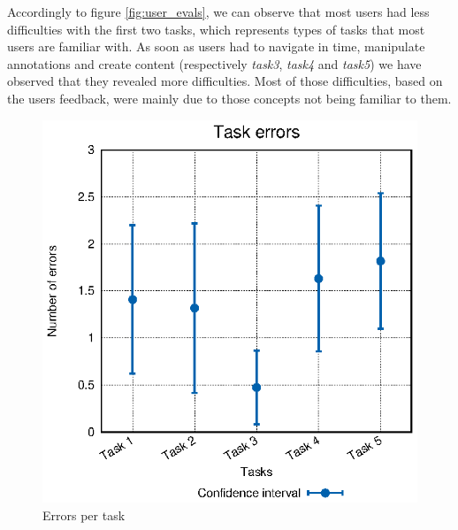 Accordingly to figure \ref{fig:user_evals}, we can observe that most users had less difficulties with the first two tasks, which represents types of tasks that most users are familiar with. As soon as users had to navigate in time, manipulate annotations and create content (respectively \emph{task3}, \emph{task4} and \emph{task5}) we have observed that they revealed more difficulties. Most of those difficulties, based on the users feedback, were mainly due to those concepts not being familiar to them.

\begin{figure}
\centering
\begin{minipage}{.5\textwidth}
  \centering
    \includegraphics[width=\textwidth]{stats/user_errors.eps}
  \caption{Errors per task}
  \label{fig:user_errors}
\end{minipage}%
\begin{minipage}{.5\textwidth}
  \centering

\end{minipage}
\end{figure}
